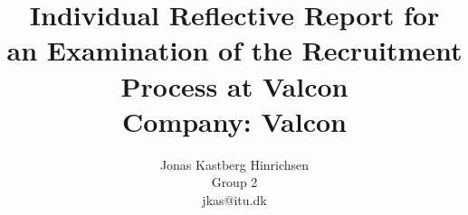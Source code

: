\documentclass[hidelinks, a4paper]{report}
\begin{document}
\title{Individual Reflective Report for\\an Examination of the Recruitment Process at Valcon\\ \vspace{2 mm} {\large Company: Valcon}}
\author{Jonas Kastberg Hinrichsen \\ Group 2 \\ jkas@itu.dk}

\maketitle


\end{document}
